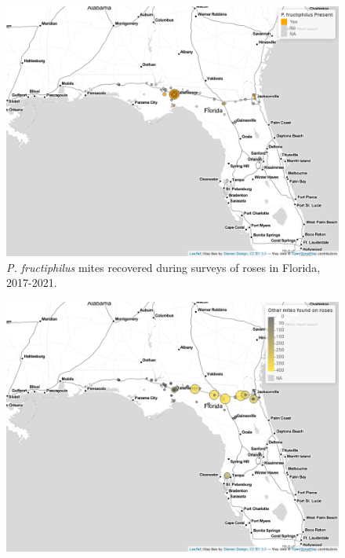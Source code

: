 \documentclass[12pt,final,CPage]{ufthesis}
\begin{document}
{  \FloatBarrier
  \begin{figure}[p]

  {\centering \includegraphics[width=1\linewidth]{figure/rrv_survey_map_fl_pf} 

  }

  \caption[\textit{P. fructiphilus} mites recovered during surveys of roses in Florida]{\textit{P. fructiphilus} mites recovered during surveys of roses in Florida, 2017-2021.}\label{fig:survey-map-1}
  \end{figure}
  \begin{figure}[p]

  {\centering \includegraphics[width=1\linewidth]{figure/rrv_survey_map_fl_other} 

}
\end{figure}}
\end{document}
